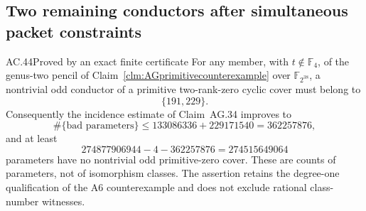 \subsection{Two remaining conductors after simultaneous packet constraints}

\begin{claim}{AC.44}{Proved by an exact finite certificate}
\label{clm:ACpacketconductors}
For any member, with \(t\notin\mathbb F_4\), of the genus-two pencil of
Claim~\ref{clm:AGprimitivecounterexample} over
\(\mathbb F_{2^{38}}\), a nontrivial odd conductor of a
primitive two-rank-zero cyclic cover must belong to
\[
                              \{191,229\}.
\tag{AC.44.1}
\]
Consequently the incidence estimate of Claim~AG.34 improves to
\[
 \#\{\text{bad parameters}\}
       \le133086336+229171540=362257876,
\]
and at least
\[
              274877906944-4-362257876=274515649064
\tag{AC.44.2}
\]
parameters have no nontrivial odd primitive-zero cover.
These are counts of parameters, not of isomorphism classes.
The assertion retains the degree-one qualification of the A6
counterexample and does not exclude rational class-number witnesses.
\end{claim}

